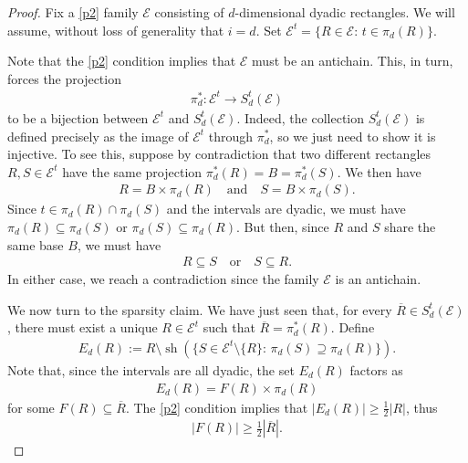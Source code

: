 \documentclass[oneside]{amsart}
\theoremstyle{definition}
\theoremstyle{plain}
\numberwithin{equation}{section}
\numberwithin{theorem}{section}
\newcommand{\sh}{\operatorname{sh}}
\begin{document}
\begin{proof}
  Fix a \eqref{p2} family $\mathcal{E}$ consisting of $d$-dimensional dyadic
  rectangles. We will assume, without loss of generality that $i=d$.
  Set $\mathcal{E}^t = \{R \in \mathcal{E}:\, t \in \pi_d(R)\}$.

  Note that the \eqref{p2} condition implies that $\mathcal{E}$ must be an
  antichain.
  This, in turn, forces the projection
  \begin{align*}
    \pi_d^* : \mathcal{E}^t \to S_d^t(\mathcal{E})
  \end{align*}
  to be a bijection between $\mathcal{E}^t$ and $S_d^t(\mathcal{E})$.
  Indeed, the collection $S_d^t(\mathcal{E})$ is defined precisely as the image
  of $\mathcal{E}^t$ through $\pi_d^*$, so we just need to show it is injective.
  To see this, suppose by contradiction that two different rectangles
  $R, S \in \mathcal{E}^t$
  have the same projection $\pi_d^*(R) = B = \pi_d^*(S)$.
  We then have
  \begin{align*}
    R = B \times \pi_d(R) \quad\text{and}\quad S = B \times \pi_d(S).
  \end{align*}
  Since $t \in \pi_d(R) \cap \pi_d(S)$ and the intervals are dyadic, we must
  have $\pi_d(R) \subseteq \pi_d(S)$ or $\pi_d(S) \subseteq \pi_d(R)$.
  But then, since $R$ and $S$ share the same base $B$, we must have
  \begin{align*}
    R \subseteq S \quad\text{or}\quad S \subseteq R.
  \end{align*}
  In either case, we reach a contradiction since the family $\mathcal{E}$ is an
  antichain.

  We now turn to the sparsity claim.
  We have just seen that, for every $\overline{R} \in S_d^t(\mathcal{E})$, there
  must exist a unique $R \in \mathcal{E}^t$ such that
  $\overline{R} = \pi_d^*(R)$. Define
  \begin{align*}
    E_d(R) := R \setminus \sh(\{S \in \mathcal{E}^t \setminus \{R\}:\,
      \pi_d(S) \supseteq \pi_d(R) \}).
  \end{align*}
  Note that, since the intervals are all dyadic, the set $E_d(R)$ factors as
  \begin{align*}
    E_d(R) = F(R) \times \pi_d(R)
  \end{align*}
  for some $F(R) \subseteq \overline{R}$.
  The \eqref{p2} condition implies that $|E_d(R)| \geq \frac{1}{2}|R|$, thus
  \begin{align*}
    |F(R)| \geq \frac{1}{2}|\overline{R}|.
  \end{align*}


\end{proof}
\end{document}
